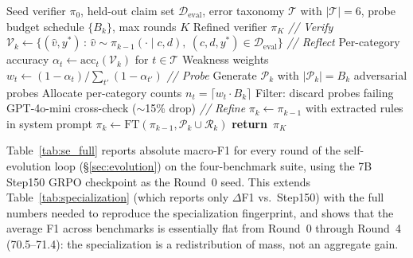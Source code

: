 \documentclass{article}
\providecommand{\RETURN}{\STATE \textbf{return}~}
\begin{document}
\begin{algorithm}[h]
\small
\caption{Self-Evolution Loop}
\label{alg:sevolve}
\begin{algorithmic}[1]
\REQUIRE Seed verifier $\pi_0$, held-out claim set $\mathcal{D}_{\text{eval}}$, error taxonomy $\mathcal{T}$ with $|\mathcal{T}|{=}6$, probe budget schedule $\{B_k\}$, max rounds $K$
\ENSURE Refined verifier $\pi_K$
  \STATE \textit{// Verify}
  \STATE $\mathcal{V}_k \gets \{(\hat{v}, y^*) \,:\, \hat{v} \sim \pi_{k-1}(\cdot \mid c, d),\ (c, d, y^*) \in \mathcal{D}_{\text{eval}}\}$
  \STATE \textit{// Reflect}
  \STATE Per-category accuracy $\alpha_t \gets \mathrm{acc}_t(\mathcal{V}_k)$ for $t \in \mathcal{T}$
  \STATE Weakness weights $w_t \gets (1 - \alpha_t)/\sum_{t'}(1 - \alpha_{t'})$
  \STATE \textit{// Probe}
  \STATE Generate $\mathcal{P}_k$ with $|\mathcal{P}_k|{=}B_k$ adversarial probes
  \STATE Allocate per-category counts $n_t = \lceil w_t \cdot B_k \rceil$
  \STATE Filter: discard probes failing GPT-4o-mini cross-check ($\sim$15\% drop)
  \STATE \textit{// Refine}
    \STATE $\pi_k \gets \pi_{k-1}$ with extracted rules in system prompt 
  \ELSE
    \STATE $\pi_k \gets \mathrm{FT}(\pi_{k-1}, \mathcal{P}_k \cup \mathcal{R}_k)$ 
  \ENDIF
\ENDFOR
\RETURN $\pi_K$
\end{algorithmic}
\end{algorithm}

Table~\ref{tab:se_full} reports absolute macro-F1 for every round of the self-evolution loop (\S\ref{sec:evolution}) on the four-benchmark suite, using the 7B Step150 GRPO checkpoint as the Round~0 seed.
This extends Table~\ref{tab:specialization} (which reports only $\Delta$F1 vs.\ Step150) with the full numbers needed to reproduce the specialization fingerprint, and shows that the average F1 across benchmarks is essentially flat from Round~0 through Round~4 (70.5--71.4): the specialization is a redistribution of mass, not an aggregate gain.
\end{document}
